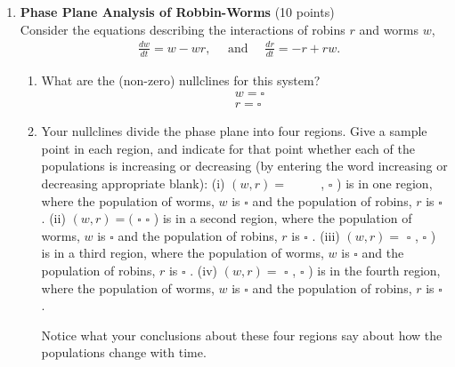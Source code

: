 \begin{enumerate}
  \item \textbf{Phase Plane Analysis of Robbin-Worms} (10 points)\\
  Consider the equations describing the interactions of robins $r$ and worms $w$,
  $$
  \begin{aligned}
  & \frac{d w}{d t}=w-w r, \quad \text { and } \quad \frac{d r}{d t}=-r+r w .
  \end{aligned}
  $$
  \begin{enumerate}[label=(\alph*)]
    \item What are the (non-zero) nullclines for this system?
    $$
    \begin{aligned}
    & w=\square \\
    & r=\square
    \end{aligned}
    $$
    \begin{subanswer}
    \end{subanswer}
    \item Your nullclines divide the phase plane into four regions. Give a sample point in each region, and indicate for that point whether each of the populations is increasing or decreasing (by entering the word increasing or decreasing appropriate blank):
    (i) $(w, r)=$ $\qquad$ , $\square$ ) is in one region, where the population of worms, $w$ is $\square$ and the population of robins, $r$ is $\square$ .
    (ii) $(w, r)=($ $\square$
    $\square$ ) is in a second region, where the population of worms, $w$ is $\square$ and the population of robins, $r$ is $\square$ .
    (iii) $(w, r)=$ $\square$ , $\square$ ) is in a third region, where the population of worms, $w$ is $\square$ and the population of robins, $r$ is $\square$ .
    (iv) $(w, r)=$ $\square$ , $\square$ ) is in the fourth region, where the population of worms, $w$ is $\square$ and the population of robins, $r$ is $\square$ .
    \begin{subanswer}
    \end{subanswer}
    Notice what your conclusions about these four regions say about how the populations change with time.
  \end{enumerate}


\end{enumerate}
